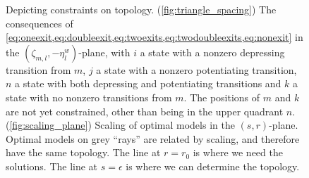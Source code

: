 \documentclass[12pt]{article}
\newcommand{\etwm}{\eta^w}
\newcommand{\dgnm}{\zeta}
\begin{document}
\begin{figure}[ht]
\begin{center}
\begin{myenuma}
  \item \label{fig:triangle_spacing} 
  \hspace{0.2em}
  \item \label{fig:scaling_plane}
\end{myenuma}
\caption[Depicting constraints on topology]{Depicting constraints on topology.
(\ref*{fig:triangle_spacing}) The consequences of \cref{eq:oneexit,eq:doubleexit,eq:twoexits,eq:twodoubleexits,eq:nonexit} in the \( (\dgnm_{m,l},-\etwm_l) \)-plane, 
  with \(i\) a state with a nonzero depressing transition from \(m\), 
  \(j\) a state with a nonzero potentiating transition, 
  \(n\) a state with both depressing and potentiating transitions 
  and \(k\) a state with no nonzero transitions from \(m\).
  The positions of \(m\) and \(k\) are not yet constrained, other than being in the upper quadrant \wrt \(n\).
(\ref*{fig:scaling_plane}) Scaling of optimal models in the \((s,r)\)-plane.
  Optimal models on grey ``rays'' are related by scaling, and therefore have the same topology.
  The line at \(r = r_0\) is where we need the solutions.
  The line at \(s = \epsilon\) is where we can determine the topology.
\label{fig:planes}}
\end{center}
\end{figure}
\end{document}
